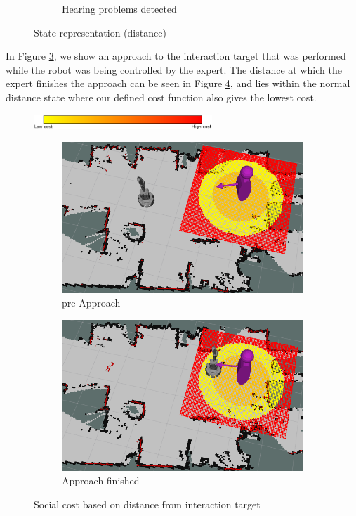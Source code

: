 \documentclass[a4paper,11pt]{report}
\begin{document}
\begin{figure}
\begin{subfigure}[b]{0.45\textwidth}
        \caption{Hearing problems detected}
        \label{fig:state_res_distance_2}
    \end{subfigure}
    \caption{State representation (distance)}
    \label{fig:state_res_distance}
\end{figure}

In Figure \ref{fig:cost_function_1}, we show an approach to the interaction target that was performed while the robot was being controlled by the expert. The distance at which the expert finishes the approach can be seen in Figure \ref{fig:cost_function_2}, and lies within the normal distance state where our defined cost function also gives the lowest cost.

\begin{figure}
    \centering
    \includegraphics[width=0.6\textwidth]{figures/colour_bar.png}
    \begin{subfigure}[b]{0.45\textwidth}
        \includegraphics[width=\textwidth]{figures/cost_function_1.png}
        \caption{pre-Approach}
        \label{fig:cost_function_1}
    \end{subfigure}
    \begin{subfigure}[b]{0.45\textwidth}
        \includegraphics[width=\textwidth]{figures/cost_function_2.png}
        \caption{Approach finished}
        \label{fig:cost_function_2}
    \end{subfigure}   
    \caption{Social cost based on distance from interaction target}
    \label{fig:cost_function}
\end{figure}
\end{document}

